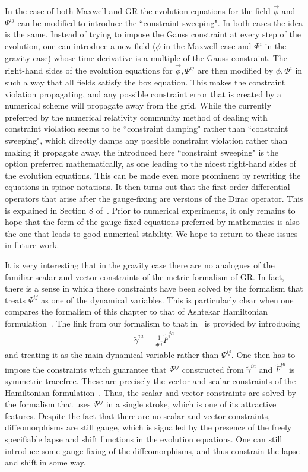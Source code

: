 \documentclass[10pt]{report}
\theoremstyle{definition}
\begin{document}
In the case of both Maxwell and GR the evolution equations for the field $\vec{\phi}$ and $\Psi^{ij}$ can be modified to introduce the ``constraint sweeping". In both cases the idea is the same. Instead of trying to impose the Gauss constraint at every step of the evolution, one can introduce a new field ($\phi$ in the Maxwell case and $\Phi^i$ in the gravity case) whose time derivative is a multiple of the Gauss constraint. The right-hand sides of the evolution equations for $\vec{\phi}, \Psi^{ij}$ are then modified by $\phi, \Phi^i$ in such a way that all fields satisfy the box equation. This makes the constraint violation propagating, and any possible constraint error that is created by a numerical scheme will propagate away from the grid. While the currently preferred by the numerical relativity community method of dealing with constraint violation seems to be ``constraint damping" rather than ``constraint sweeping", which directly damps any possible constraint violation rather than making it propagate away, the introduced here ``constraint sweeping" is the option preferred mathematically, as one leading to the nicest right-hand sides of the evolution equations. This can be made even more prominent by rewriting the equations in spinor notations. It then turns out that the first order differential operators that arise after the gauge-fixing are versions of the Dirac operator. This is explained in Section 8 of~\cite{FormGenRelGravity2020}. Prior to numerical experiments, it only remains to hope that the form of the gauge-fixed equations preferred by mathematics is also the one that leads to good numerical stability. We hope to return to these issues in future work. 

It is very interesting that in the gravity case there are no analogues of the familiar scalar and vector constraints of the metric formalism of GR. In fact, there is a sense in which these constraints have been solved by the formalism that treats $\Psi^{ij}$ as one of the dynamical variables. This is particularly clear when one compares the formalism of this chapter to that of Ashtekar Hamiltonian formulation~\cite{New_Hamiltonian_Ashtek_1987}. The link from our formalism to that in~\cite{New_Hamiltonian_Ashtek_1987} is provided by introducing 
\begin{align}
\tilde{\gamma}^{ia} = \frac{1}{\Psi^{ij}} \tilde{F}^{ja}
\end{align}
and treating it as the main dynamical variable rather than $\Psi^{ij}$. One then has to impose the constraints which guarantee that $\Psi^{ij}$ constructed from $\tilde{\gamma}^{ia}$ and $\tilde{F}^{ia}$ is symmetric tracefree. These are precisely the vector and scalar constraints of the Hamiltonian formulation~\cite{New_Hamiltonian_Ashtek_1987}. Thus, the scalar and vector constraints are solved by the formalism that uses $\Psi^{ij}$ in a single stroke, which is one of its attractive features. Despite the fact that there are no scalar and vector constraints, diffeomorphisms are still gauge, which is signalled by the presence of the freely specifiable lapse and shift functions in the evolution equations. One can still introduce some gauge-fixing of the diffeomorphisms, and thus constrain the lapse and shift in some way.
\end{document}
